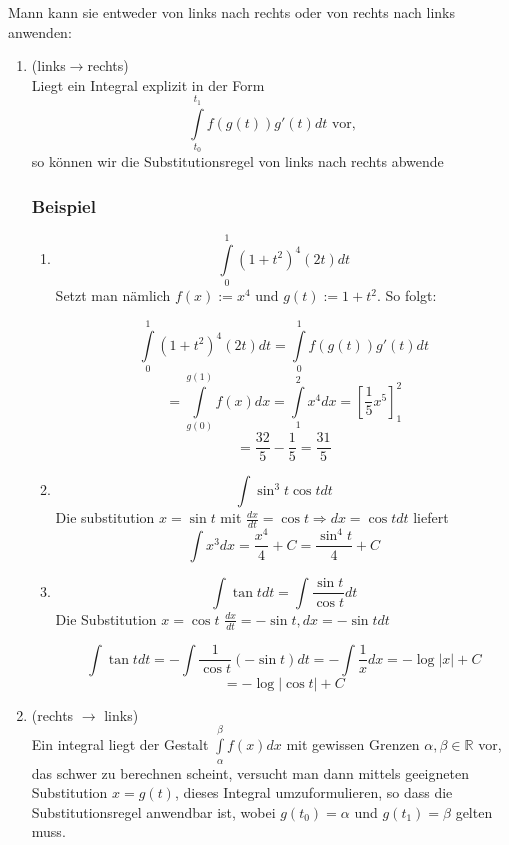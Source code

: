 \noindent Mann kann sie entweder von links nach rechts oder von rechts nach links anwenden: 
\begin{enumerate}
\item (links$\rightarrow$rechts)\\
Liegt ein Integral explizit in der Form \[\int\limits_{{t_0}}^{{t_1}} {f\left( {g(t)} \right)g'(t)dt} \text{ vor,}\] so können wir die Substitutionsregel von links nach rechts abwende
\subsubsection*{Beispiel}
\begin{enumerate}
\item \[\int\limits_0^1 {{{(1 + {t^2})}^4}(2t)dt} \] Setzt man nämlich $f(x):=x^4$ und $g(t):=1+t^2$. So folgt:

\[\int\limits_0^1 {{{(1 + {t^2})}^4}(2t)dt}  = \int\limits_0^1 {f\left( {g(t)} \right)g'(t)dt} \]
\[ = \int\limits_{g(0)}^{g(1)} {f(x)dx = } \int\limits_1^2 {{x^4}dx = \left[ {\frac{1}{5}{x^5}} \right]_1^2} \]
\[ = \frac{{32}}{5} - \frac{1}{5} = \frac{{31}}{5}\]



\item \[\int {{{\sin }^3}t\cos t dt} \] Die substitution $x=\sin t$ mit $\frac{dx}{dt}=\cos t \Rightarrow dx=\cos t dt$ liefert \[\int {{x^3}dx = \frac{{{x^4}}}{4} + C = \frac{{{{\sin }^4}t}}{4}}  + C\]
\item \[\int {\tan tdt = \int {\frac{{\sin t}}{{\cos t}}dt} } \] Die Substitution $x=\cos t$ $\frac{dx}{dt}=-\sin t, dx=-\sin t dt$ 

\[\int {\tan tdt =  - \int {\frac{1}{{\cos t}}( - \sin t)dt =  - \int {\frac{1}{x}} } } dx =  - \log \left| x \right| + C\]
\[ =  - \log \left| {\cos t} \right| + C\]

\end{enumerate}
\item (rechts $\rightarrow$ links)\\
Ein integral liegt der Gestalt $\int\limits_\alpha ^\beta  {f(x)dx}$ mit gewissen Grenzen $\alpha,\beta\in\mathbb{R}$ vor, das schwer zu berechnen scheint, versucht man dann mittels geeigneten Substitution $x=g(t)$, dieses Integral umzuformulieren, so dass die Substitutionsregel anwendbar ist, wobei $g(t_0)=\alpha$ und $g(t_1)=\beta$ gelten muss. 

\end{enumerate}
